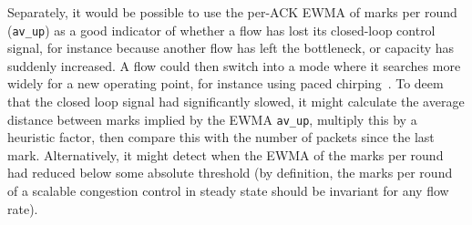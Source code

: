 Separately, it would be possible to use the per-ACK EWMA of marks per round (\texttt{av\_up}) as a good indicator of whether a flow has lost its closed-loop control signal, for instance because another flow has left the bottleneck, or capacity has suddenly increased. A flow could then switch into a mode where it searches more widely for a new operating point, for instance using paced chirping~\cite[\S\,3]{Misund19a:Paced_Chirping_Linux}. To deem that the closed loop signal had significantly slowed, it might calculate the average distance between marks implied by the EWMA \texttt{av\_up}, multiply this by a heuristic factor, then compare this with the number of packets since the last mark. Alternatively, it might detect when the EWMA of the marks per round had reduced below some absolute threshold (by definition, the marks per round of a scalable congestion control in steady state should be invariant for any flow rate).
